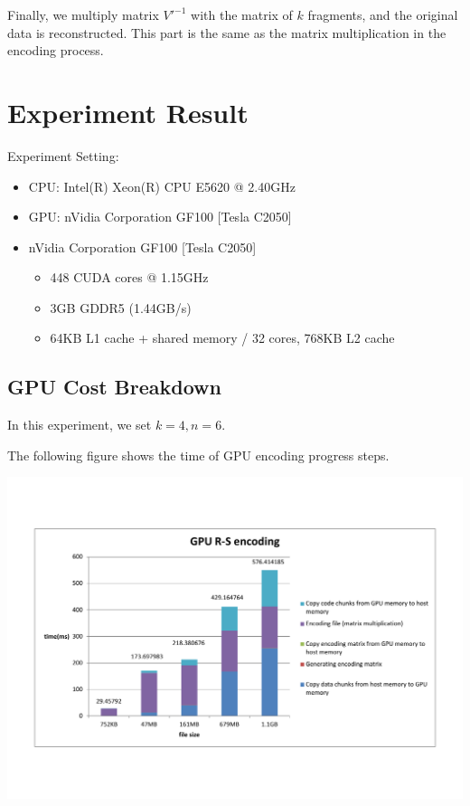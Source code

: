 \documentclass[a4paper]{article}
\begin{document}
Finally, we multiply matrix $V'^{-1}$ with the matrix of $k$ fragments,
and the original data is reconstructed. This part is the same as the matrix multiplication in the encoding process.

\section{Experiment Result}
Experiment Setting:
\begin{itemize}
  \item CPU: Intel(R) Xeon(R) CPU E5620  @ 2.40GHz
  \item GPU: nVidia Corporation GF100 [Tesla C2050]
  \item nVidia Corporation GF100 [Tesla C2050]
	\begin{itemize}
	  \item 448 CUDA cores @ 1.15GHz
	  \item 3GB GDDR5 (1.44GB/s)
	  \item 64KB L1 cache + shared memory / 32 cores, 768KB L2 cache
	\end{itemize}
\end{itemize}

\subsection{GPU Cost Breakdown}

In this experiment, we set $k=4, n=6$.

The following figure shows the time of GPU encoding progress steps.

\includegraphics[scale=0.48]{result-graph/GPU-encode-steps.pdf}
\end{document}
